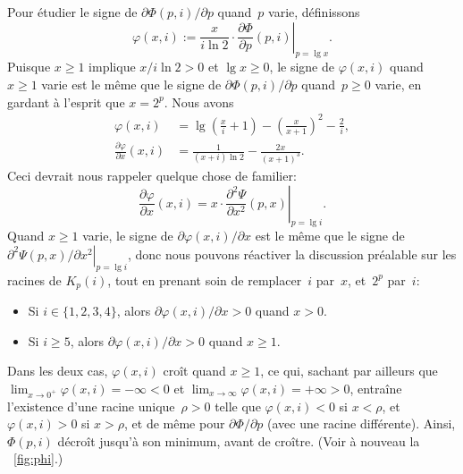 Pour étudier le signe de \(\partial\Phi(p,i)/\partial p\) quand~\(p\)
varie, définissons
\begin{equation*}
\varphi(x,i) := \frac{x}{i\ln 2} \cdot
                \left.\frac{\partial\Phi}{\partial
                    p}(p,i)\right|_{p=\lg x}.
\end{equation*}
Puisque \(x \geqslant 1\) implique \(x/i\ln 2 > 0\) et \(\lg x
\geqslant 0\), le signe de \(\varphi(x,i)\) quand~\(x \geqslant 1\)
varie est le même que le signe de \(\partial\Phi(p,i)/\partial p\)
quand~\(p \geqslant 0\) varie, en gardant à l'esprit
que \(x=2^p\). Nous avons
\begin{align*}
\varphi(x,i) &= \lg\left(\frac{x}{i}+1\right) -
\left(\!\frac{x}{x+1}\!\right)^2 - \frac{2}{i},\\
\frac{\partial\varphi}{\partial x}(x,i) &=
\frac{1}{(x+i)\ln 2} - \frac{2x}{(x+1)^3}.
\end{align*}
Ceci devrait nous rappeler quelque chose de familier:
\begin{equation*}
\frac{\partial\varphi}{\partial x}(x,i) =
  x \cdot \left.\frac{\partial^2\Psi}{\partial x^2}(p,x)\right|_{p=\lg
  i}.
\end{equation*}
Quand \(x \geqslant 1\) varie, le signe de
\(\partial\varphi(x,i)/\partial x\) est le même que le signe de
\(\left.\partial^2\Psi(p,x)/\partial x^2\right|_{p=\lg i}\), donc nous
pouvons réactiver la discussion préalable sur les racines de
\(K_p(i)\), tout en prenant soin de remplacer~\(i\) par~\(x\),
et~\(2^p\) par~\(i\):
\begin{itemize}

\item Si \(i \in \{1,2,3,4\}\), alors \(\partial\varphi(x,i)/\partial x
  > 0\) quand \(x > 0\).

\item Si \(i \geqslant 5\), alors \(\partial\varphi(x,i)/\partial x >
  0\) quand \(x \geqslant 1\).

\end{itemize}
Dans les deux cas, \(\varphi(x,i)\) croît quand \(x \geqslant 1\), ce
qui, sachant par ailleurs que \(\lim_{x\to 0^{+}}\varphi(x,i) =
-\infty < 0\) et \(\lim_{x\to\infty}\varphi(x,i) = +\infty > 0\),
entraîne l'existence d'une racine unique~\(\rho > 0\) telle que
\(\varphi(x,i) < 0\) si \(x < \rho\), et \(\varphi(x,i) > 0\) si \(x >
\rho\), et de même pour \(\partial\Phi/\partial p\) (avec une racine
différente). Ainsi, \(\Phi(p,i)\) décroît jusqu'à son minimum, avant
de croître. (Voir à nouveau la \fig~\vref{fig:phi}.)

